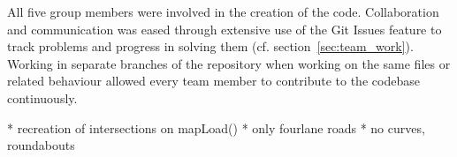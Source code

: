 All five group members were involved in the creation of the code. Collaboration and communication was eased through extensive use of the Git Issues feature to track problems and progress in solving them (cf. section~\ref{sec:team_work}). Working in separate branches of the repository when working on the same files or related behaviour allowed every team member to contribute to the codebase continuously.  

\bigskip
* recreation of intersections on mapLoad()
* only fourlane roads
* no curves, roundabouts
